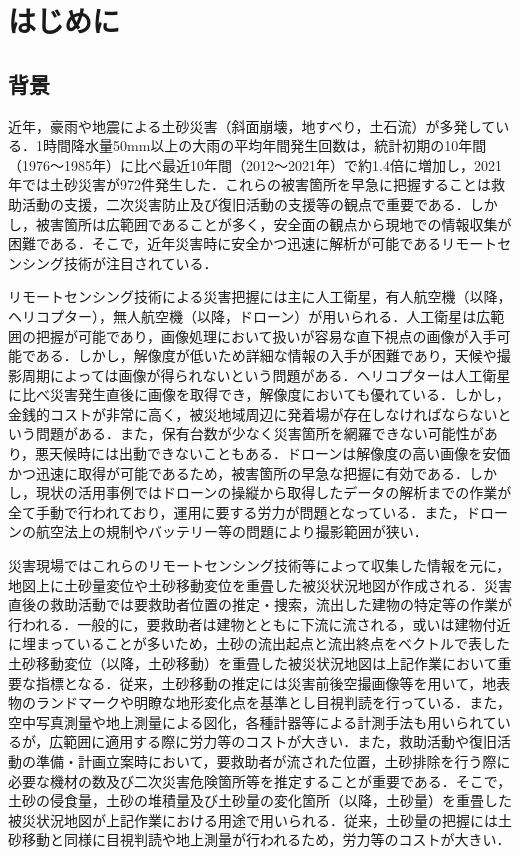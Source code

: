 \chapter{はじめに}
  \section{背景}
    近年，豪雨や地震による土砂災害（斜面崩壊，地すべり，土石流）が多発している．1時間降水量50mm以上の大雨の平均年間発生回数は，統計初期の10年間（1976〜1985年）に比べ最近10年間（2012〜2021年）で約1.4倍に増加し，2021年では土砂災害が972件発生した\cite{背景1, 背景2}．これらの被害箇所を早急に把握することは救助活動の支援，二次災害防止及び復旧活動の支援等の観点で重要である．しかし，被害箇所は広範囲であることが多く，安全面の観点から現地での情報収集が困難である\cite{背景3}．そこで，近年災害時に安全かつ迅速に解析が可能であるリモートセンシング技術が注目されている\cite{背景4}．

    リモートセンシング技術による災害把握には主に人工衛星，有人航空機（以降，ヘリコプター），無人航空機（以降，ドローン）が用いられる．人工衛星は広範囲の把握が可能であり，画像処理において扱いが容易な直下視点の画像が入手可能である．しかし，解像度が低いため詳細な情報の入手が困難であり，天候や撮影周期によっては画像が得られないという問題がある．ヘリコプターは人工衛星に比べ災害発生直後に画像を取得でき，解像度においても優れている．しかし，金銭的コストが非常に高く，被災地域周辺に発着場が存在しなければならないという問題がある．また，保有台数が少なく災害箇所を網羅できない可能性があり，悪天候時には出動できないこともある．ドローンは解像度の高い画像を安価かつ迅速に取得が可能であるため，被害箇所の早急な把握に有効である．しかし，現状の活用事例ではドローンの操縦から取得したデータの解析までの作業が全て手動で行われており，運用に要する労力が問題となっている．また，ドローンの航空法上の規制やバッテリー等の問題により撮影範囲が狭い\cite{背景5, 背景6, 背景7}．

    災害現場ではこれらのリモートセンシング技術等によって収集した情報を元に，地図上に土砂量変位や土砂移動変位を重畳した被災状況地図が作成される．災害直後の救助活動では要救助者位置の推定・捜索，流出した建物の特定等の作業が行われる．一般的に，要救助者は建物とともに下流に流される，或いは建物付近に埋まっていることが多いため，土砂の流出起点と流出終点をベクトルで表した土砂移動変位（以降，土砂移動）を重畳した被災状況地図は上記作業において重要な指標となる．従来，土砂移動の推定には災害前後空撮画像等を用いて，地表物のランドマークや明瞭な地形変化点を基準とし目視判読を行っている．また，空中写真測量や地上測量による図化，各種計器等による計測手法も用いられているが，広範囲に適用する際に労力等のコストが大きい\cite{土砂移動解析背景1, 土砂移動解析背景2}．また，救助活動や復旧活動の準備・計画立案時において，要救助者が流された位置，土砂排除を行う際に必要な機材の数及び二次災害危険箇所等を推定することが重要である．そこで，土砂の侵食量，土砂の堆積量及び土砂量の変化箇所（以降，土砂量）を重畳した被災状況地図が上記作業における用途で用いられる．従来，土砂量の把握には土砂移動と同様に目視判読や地上測量が行われるため，労力等のコストが大きい\cite{土砂量解析背景1, 土砂量解析背景2}．



